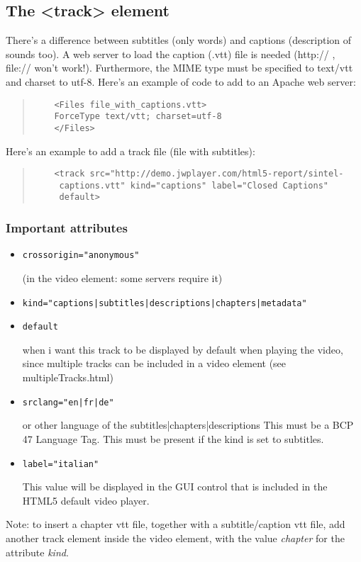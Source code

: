 \documentclass[a4paper,11pt]{book}
\begin{document}
	\subsection{The <track> element}
	There's a difference between subtitles (only words) and captions (description of sounds too).
	A web server to load the caption (.vtt) file is needed (http:// , file:// won't work!). Furthermore, the MIME
	type must be specified to text/vtt and charset to utf-8. Here's an example of code to add to an Apache web server:
	\begin{verse}
	\begin{verbatim}
	<Files file_with_captions.vtt>
	ForceType text/vtt; charset=utf-8
	</Files>
	\end{verbatim}
	\end{verse}
	Here's an example to add a track file (file with subtitles):
	\begin{verse}
	\begin{verbatim}
	<track src="http://demo.jwplayer.com/html5-report/sintel-
	 captions.vtt" kind="captions" label="Closed Captions"
	 default>
	\end{verbatim}
	\end{verse}
	
	\subsubsection{Important attributes}
	\begin{itemize}
	\item \begin{verbatim}crossorigin="anonymous"\end{verbatim} (in the video element: some servers require it)
	\item \begin{verbatim}kind="captions|subtitles|descriptions|chapters|metadata"\end{verbatim}
	\item \begin{verbatim}default\end{verbatim} when i want this track to be displayed by default when playing the video,
		since multiple tracks can be included in a video element (see multipleTracks.html)
	\item \begin{verbatim}srclang="en|fr|de"\end{verbatim} or other language of the subtitles|chapters|descriptions
	This must be a BCP 47 Language Tag. This must be present if the kind is set to subtitles.
	\item \begin{verbatim}label="italian"\end{verbatim} This value will be displayed in the GUI control that is included
	in the HTML5 default video player.
	\end{itemize}
	Note: to insert a chapter vtt file, together with a subtitle/caption vtt file, add another track element
	inside the video element, with the value \emph{chapter} for the attribute \emph{kind}.
\end{document}
